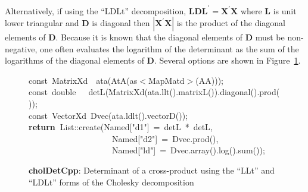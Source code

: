 \documentclass[shortnames,article]{jss}
\newcommand{\hlstd}[1]{\textcolor[rgb]{0,0,0}{#1}}
\newcommand{\hlopt}[1]{\textcolor[rgb]{0,0,0}{#1}}
\newcommand{\hlstr}[1]{\textcolor[rgb]{0.90,0.15,0.15}{#1}}
\newcommand{\hlkwa}[1]{\textcolor[rgb]{0.61,0.13,0.93}{\bf{#1}}}
\newcommand{\hlkwb}[1]{\textcolor[rgb]{0.13,0.54,0.13}{#1}}
\newcommand{\hlkwd}[1]{\textcolor[rgb]{0,0,0}{#1}}
\begin{document}
Alternatively, if using the ``LDLt'' decomposition, $\bm L\bm D\bm
L^\prime=\bm X^\prime\bm X$ where $\bm L$ is unit lower triangular and
$\bm D$ is diagonal then $|\bm X^\prime\bm X|$ is the product of the
diagonal elements of $\bm D$.  Because it is known that the diagonal
elements of $\bm D$ must be non-negative, one often evaluates the
logarithm of the determinant as the sum of the logarithms of the
diagonal elements of $\bm D$.  Several options are shown in
Figure~\ref{cholDet}.

\begin{figure}[htb]
    \noindent
    \ttfamily
    \hlstd{}\hlkwb{const\ }\hlstd{MatrixXd}\hlstd{\ \ }\hlstd{}\hlkwd{ata}\hlstd{}\hlopt{(}\hlstd{}\hlkwd{AtA}\hlstd{}\hlopt{(}\hlstd{as}\hlopt{$<$}\hlstd{MapMatd}\hlopt{$>$(}\hlstd{AA}\hlopt{)));}\hspace*{\fill}\\
    \hlstd{}\hlkwb{const\ double}\hlstd{\ \ \ }\hlkwb{}\hlstd{}\hlkwd{detL}\hlstd{}\hlopt{(}\hlstd{}\hlkwd{MatrixXd}\hlstd{}\hlopt{(}\hlstd{ata}\hlopt{.}\hlstd{}\hlkwd{llt}\hlstd{}\hlopt{().}\hlstd{}\hlkwd{matrixL}\hlstd{}\hlopt{()).}\hlstd{}\hlkwd{diagonal}\hlstd{}\hlopt{().}\hlstd{}\hlkwd{prod}\hlstd{}\hlopt{());}\hspace*{\fill}\\
    \hlstd{}\hlkwb{const\ }\hlstd{VectorXd\ }\hlkwd{Dvec}\hlstd{}\hlopt{(}\hlstd{ata}\hlopt{.}\hlstd{}\hlkwd{ldlt}\hlstd{}\hlopt{().}\hlstd{}\hlkwd{vectorD}\hlstd{}\hlopt{());}\hspace*{\fill}\\
    \hlstd{}\hlkwa{return\ }\hlstd{List}\hlopt{::}\hlstd{}\hlkwd{create}\hlstd{}\hlopt{(}\hlstd{Named}\hlopt{{[}}\hlstd{}\hlstr{"d1"}\hlstd{}\hlopt{{]}\ =\ }\hlstd{detL\ }\hlopt{{*}\ }\hlstd{detL}\hlopt{,}\hspace*{\fill}\\
    \hlstd{}\hlstd{\ \ \ \ \ \ \ \ \ \ \ \ \ \ \ \ \ \ \ \ }\hlstd{Named}\hlopt{{[}}\hlstd{}\hlstr{"d2"}\hlstd{}\hlopt{{]}\ =\ }\hlstd{Dvec}\hlopt{.}\hlstd{}\hlkwd{prod}\hlstd{}\hlopt{(),}\hspace*{\fill}\\
    \hlstd{}\hlstd{\ \ \ \ \ \ \ \ \ \ \ \ \ \ \ \ \ \ \ \ }\hlstd{Named}\hlopt{{[}}\hlstd{}\hlstr{"ld"}\hlstd{}\hlopt{{]}\ =\ }\hlstd{Dvec}\hlopt{.}\hlstd{}\hlkwd{array}\hlstd{}\hlopt{().}\hlstd{}\hlkwd{log}\hlstd{}\hlopt{().}\hlstd{}\hlkwd{sum}\hlstd{}\hlopt{());}\hlstd{}\hspace*{\fill}\\
    \mbox{}
    \normalfont
    \normalsize
  \caption{\textbf{cholDetCpp}: Determinant of a cross-product using
    the ``LLt'' and ``LDLt'' forms of the Cholesky decomposition}
  \label{cholDet}
\end{figure}
\end{document}
